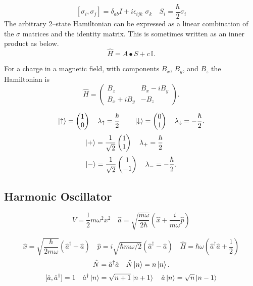 \documentclass{article}
\begin{document}
      \[ 
      [\sigma_i,\sigma_j] = \delta_{a b}I + i \epsilon_{ijk}\,\,\sigma_k \quad
      S_i = \frac{\hbar}{2}\sigma_i 
    \]
    The arbitrary 2--state Hamiltonian can be expressed as a linear combination
    of the $\sigma$ matrices and the identity matrix. This is sometimes written
    as an inner product as below.
    \[
      \hat{H} = A \bullet S + c\,\mathbb{I}
    .\] 

    For a charge in a magnetic field, with components $B_x$, $B_y$, and $B_z$
    the Hamiltonian is  \[
      \hat{H} = 
      \begin{pmatrix}
        B_z & B_x - i B_y \\ 
        B_x + i B_y  & - B_z
      \end{pmatrix}
    .\] 


      \[
      \ket{\uparrow} =
      \begin{pmatrix}
        1 \\ 
        0
      \end{pmatrix}
      \quad \lambda_\uparrow = \frac{\hbar}{2} \qquad
      \ket{\downarrow} = 
      \begin{pmatrix}
        0 \\ 
        1
      \end{pmatrix} \quad
      \lambda_\downarrow = -\frac{\hbar}{2}
      .\] 
      \[
      \ket{+} = \frac{1}{\sqrt 2}
      \begin{pmatrix}
        1 \\ 
        1
      \end{pmatrix}
      \quad \lambda_+= \frac{\hbar}{2} \qquad
    \]
    \[
      \ket{-} = \frac{1}{\sqrt 2}
      \begin{pmatrix}
        1 \\ 
        -1
      \end{pmatrix} \quad
      \lambda_-= -\frac{\hbar}{2}
      .\] 
      




    \subsection*{Harmonic Oscillator} 
      \[
        V = \frac{1}{2} m \omega^2 x^2 \quad 
        \hat{a} = \sqrt{\frac{m \omega}{2 \hbar}}( \hat{x} + \frac{i}{m \omega}\hat{p})
      \]

      \[
        \hat{x} = \sqrt{\frac{\hbar}{2 m \omega}}(\hat{a}^\dagger + \hat{a}) \quad
        \hat{p} = i \sqrt{\hbar m \omega /2 }(\hat{a}^\dagger - \hat{a}) \quad
        \hat{H} = \hbar \omega(\hat{a}^\dagger\hat{a} + \frac{1}{2})
      \]
      \[
      \hat{N} = \hat{a}^\dagger \hat{a} \quad \hat{N} \ket{n} = n \ket{n} 
      .\]  
      \[
        [\hat{a},\hat{a}^\dagger] = 1 \quad
        \hat{a}^\dagger \ket{n} = \sqrt{n + 1} \ket{n+1} \quad
        \hat{a} \ket{n} = \sqrt{n}\ket{n-1}
      \]
  
\end{document}
